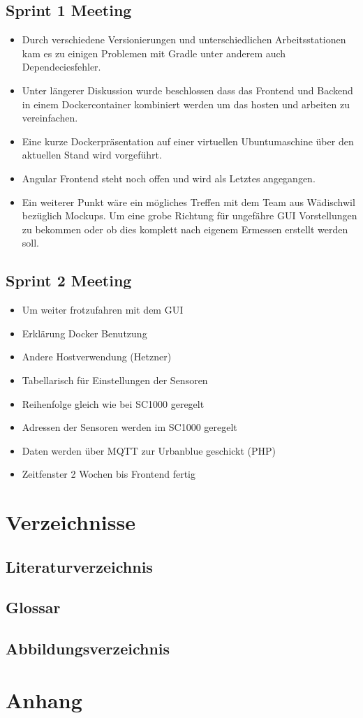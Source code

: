 \documentclass[a4paper]{article}
\begin{document}
	\subsection{Sprint 1 Meeting}
	\begin{itemize}
		\item Durch verschiedene Versionierungen und unterschiedlichen Arbeitsstationen kam es zu einigen Problemen mit Gradle unter anderem auch Dependeciesfehler.
		\item Unter längerer Diskussion wurde beschlossen dass das Frontend und Backend in einem Dockercontainer kombiniert werden um das hosten und arbeiten zu vereinfachen.
		\item Eine kurze Dockerpräsentation auf einer virtuellen Ubuntumaschine über den aktuellen Stand wird vorgeführt.
		\item Angular Frontend steht noch offen und wird als Letztes angegangen.
		\item Ein weiterer Punkt wäre ein mögliches Treffen mit dem Team aus Wädischwil bezüglich Mockups. Um eine grobe Richtung für ungefähre GUI Vorstellungen zu bekommen oder ob dies komplett nach eigenem Ermessen erstellt werden soll.
	\end{itemize}	
	\subsection{Sprint 2 Meeting}
	\begin{itemize}
		\item Um weiter frotzufahren mit dem GUI
		\item Erklärung Docker Benutzung
		\item Andere Hostverwendung (Hetzner)
		\item Tabellarisch für Einstellungen der Sensoren
		\item Reihenfolge gleich wie bei SC1000 geregelt
		\item Adressen der Sensoren werden im SC1000 geregelt
		\item Daten werden über MQTT zur Urbanblue geschickt (PHP)
		\item Zeitfenster 2 Wochen bis Frontend fertig	
	\end{itemize}
	\section{Verzeichnisse}
	\subsection{Literaturverzeichnis}
	\subsection{Glossar}
	\subsection{Abbildungsverzeichnis}
	\section{Anhang}
		
		
		
\end{document}
